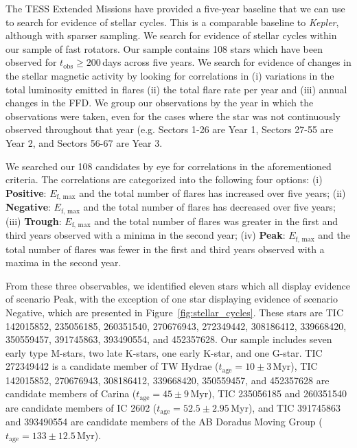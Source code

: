 \documentclass[twocolumn, linenumbers]{aastex631}
\begin{document}
The TESS Extended Missions have provided a five-year baseline that we can use to
search for evidence of stellar cycles. This is a comparable baseline to \textit{Kepler},
although with sparser sampling. We search for evidence of stellar cycles  within
our sample of fast rotators. Our sample contains 108 stars which have been observed
for $t_\textrm{obs} \geq 200$\,days across five years. We search for evidence of
changes in the stellar magnetic activity by looking for correlations in (i)
variations in the total luminosity emitted in flares  (ii) the total flare rate
per year and (iii) annual changes in the FFD.  We group our observations by the
year in which the observations were taken, even for the cases where the star was
not continuously observed throughout that year (e.g. Sectors 1-26 are Year 1,
Sectors 27-55 are Year 2, and Sectors 56-67 are Year 3.

We searched our 108 candidates by eye for correlations in the aforementioned criteria.
The correlations are categorized into the following four options: (i) \textbf{Positive}:
$E_\textrm{f, max}$ and the total number of flares has increased over five years; (ii)
\textbf{Negative}:  $E_\textrm{f, max}$ and the total number of flares has decreased
over five years; (iii) \textbf{Trough}: $E_\textrm{f, max}$ and the total number of
flares was greater in the first and third years observed with a minima in the second
year; (iv) \textbf{Peak}:  $E_\textrm{f, max}$ and the total number of flares was
fewer in the first and third years observed with a maxima in the second year.

From these three observables, we identified eleven stars which all display evidence
of scenario Peak, with the exception of one star displaying evidence of scenario
Negative, which are presented in Figure~\ref{fig:stellar_cycles}. These stars are TIC
142015852, 235056185, 260351540, 270676943, 272349442, 308186412, 339668420, 350559457,
391745863, 393490554, and 452357628.  Our sample includes seven early type M-stars,
two late K-stars, one early K-star, and one G-star. TIC 272349442 is a candidate member
of TW Hydrae ($t_\textrm{age} = 10 \pm 3$\,Myr), TIC 142015852, 270676943, 308186412,
339668420, 350559457, and 452357628 are candidate members of Carina
($t_\textrm{age} = 45 \pm 9$\,Myr), TIC 235056185 and  260351540 are candidate members
of IC 2602 ($t_\textrm{age} = 52.5 \pm 2.95$\,Myr), and TIC 391745863 and 393490554
are candidate members of the AB Doradus Moving Group ($t_\textrm{age} = 133 \pm 12.5$\,Myr).
\end{document}

